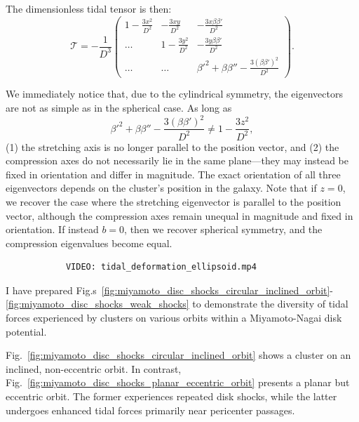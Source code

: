             The dimensionless tidal tensor is then: 
            \begin{equation}
                \mathcal{T}=-\frac{1}{D^3}\left(\begin{matrix}
                    1-\frac{3x^2}{D^2} & -\frac{3xy}{D^2} & -\frac{3x\beta \beta'}{D^2} \\
                    \dots & 1-\frac{3y^2}{D^2} & -\frac{3y\beta \beta'}{D^2} \\
                    \dots & \dots & \beta'^2 + \beta \beta'' -\frac{3\left(\beta\beta'\right)^2}{D^2}
                \end{matrix}\right).
            \end{equation}             

            We immediately notice that, due to the cylindrical symmetry, the eigenvectors are not as simple as in the spherical case. As long as 
            \[
            \beta'^2 + \beta \beta'' - \frac{3\left(\beta \beta'\right)^2}{D^2} \neq 1 - \frac{3z^2}{D^2},
            \]
            (1) the stretching axis is no longer parallel to the position vector, and (2) the compression axes do not necessarily lie in the same plane—they may instead be fixed in orientation and differ in magnitude. The exact orientation of all three eigenvectors depends on the cluster's position in the galaxy. Note that if $z = 0$, we recover the case where the stretching eigenvector is parallel to the position vector, although the compression axes remain unequal in magnitude and fixed in orientation. If instead $b = 0$, then we recover spherical symmetry, and the compression eigenvalues become equal.

            \begin{verbatim}
            VIDEO: tidal_deformation_ellipsoid.mp4
            \end{verbatim}

            I have prepared Fig.s~\ref{fig:miyamoto_disc_shocks_circular_inclined_orbit}-\ref{fig:miyamoto_disc_shocks_weak_shocks} to demonstrate the diversity of tidal forces experienced by clusters on various orbits within a Miyamoto-Nagai disk potential. 

            Fig.~\ref{fig:miyamoto_disc_shocks_circular_inclined_orbit} shows a cluster on an inclined, non-eccentric orbit. In contrast, Fig.~\ref{fig:miyamoto_disc_shocks_planar_eccentric_orbit} presents a planar but eccentric orbit. The former experiences repeated disk shocks, while the latter undergoes enhanced tidal forces primarily near pericenter passages.

